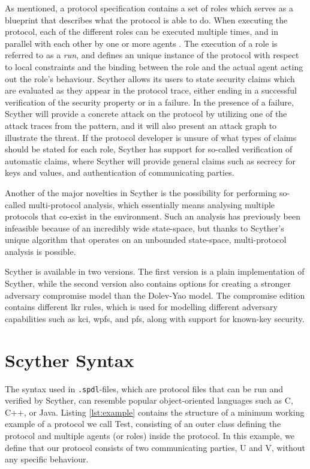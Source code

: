 As mentioned, a protocol specification contains a set of roles which serves as a blueprint that describes what the protocol is able to do. When executing the protocol, each of the different roles can be executed multiple times, and in parallel with each other by one or more agents \cite{cremers2006scyther}. The execution of a role is referred to as a \emph{run}, and defines an unique instance of the protocol with respect to local constraints and the binding between the role and the actual agent acting out the role's behaviour. Scyther allows its users to state security claims which are evaluated as they appear in the protocol trace, either ending in a successful verification of the security property or in a failure. In the presence of a failure, Scyther will provide a concrete attack on the protocol by utilizing one of the attack traces from the pattern, and it will also present an attack graph to illustrate the threat. If the protocol developer is unsure of what types of claims should be stated for each role, Scyther has support for so-called verification of automatic claims, where Scyther will provide general claims such as secrecy for keys and values, and authentication of communicating parties.

Another of the major novelties in Scyther is the possibility for performing so-called multi-protocol analysis, which essentially means analysing multiple protocols that co-exist in the environment. Such an analysis has previously been infeasible because of an incredibly wide state-space, but thanks to Scyther's unique algorithm that operates on an unbounded state-space, multi-protocol analysis is possible.

Scyther is available in two versions. The first version is a plain implementation of Scyther, while the second version also contains options for creating a stronger adversary compromise model than the Dolev-Yao model. The compromise edition contains different \gls{lkr} rules, which is used for modelling different adversary capabilities such as \gls{kci}, \gls{wpfs}, and \gls{pfs}, along with support for known-key security. 


\section{Scyther Syntax}


The syntax used in \verb!.spdl!-files, which are protocol files that can be run and verified by Scyther, can resemble popular object-oriented languages such as C, C++, or Java. Listing \ref{lst:example} contains the structure of a minimum working example of a protocol we call Test, consisting of an outer class defining the protocol and multiple agents (or roles) inside the protocol. In this example, we define that our protocol consists of two communicating parties, U and V, without any specific behaviour.\newline

